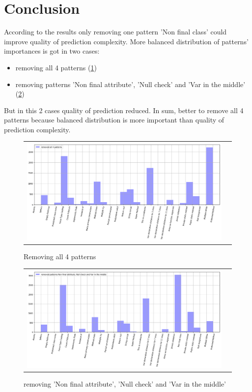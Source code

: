 \documentclass[12pt]{article}
\begin{document}
\section*{Conclusion}
According to the results only removing one pattern 'Non final class' could improve quality of prediction complexity. 
\newline
More balanced distribution of patterns' importances is got in two cases:
\begin{itemize}
	\item removing all 4 patterns (\ref{fig:ris2})
	\item removing patterns 'Non final attribute', 'Null check' and 'Var in the middle' (\ref{fig:ris1})
\end{itemize}
But in this 2 cases quality of prediction reduced.
\newline
In sum, better to remove all 4 patterns because 
balanced distribution is more important than quality 
of prediction complexity.
\begin{figure}[h!]\center
	\begin{tabular}{cc}
		\includegraphics[scale=0.25]{2.png}
	\end{tabular}
	\caption{Removing all 4 patterns}
	\label{fig:ris2}
\end{figure}
\begin{figure}[h!]\center
	\begin{tabular}{cc}
		\includegraphics[scale=0.25]{1.png}
	\end{tabular}
	\caption{removing 'Non final attribute', 'Null check' and 'Var in the middle'}
	\label{fig:ris1}
\end{figure}
\end{document}
